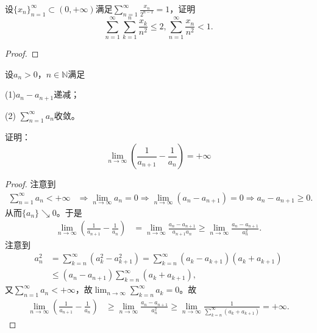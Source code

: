 \documentclass[../../main.tex]{subfiles}%
\begin{document}
\begin{example}
设$\{x_n\}_{n = 1}^{\infty} \subset (0,+\infty)$满足$\sum_{n = 1}^{\infty} \frac{x_n}{2^{n - 1}} = 1$，证明
\[
\sum_{n = 1}^{\infty} \sum_{k = 1}^n \frac{x_k}{n^2} \leqslant 2, \sum_{n = 1}^{\infty} \frac{x_n}{n^2} < 1.
\]
\end{example}
\begin{proof}



\end{proof}

\begin{example}
设$a_n > 0$，$n \in \mathbb{N}$满足

(1)$a_n - a_{n + 1}$递减；

(2) $\sum_{n = 1}^{\infty} a_n$收敛。

证明：
\[
\lim_{n \to \infty} \left( \frac{1}{a_{n + 1}} - \frac{1}{a_n} \right) = +\infty
\]
\end{example}
\begin{proof}

注意到
\begin{align*}
\sum_{n=1}^{\infty}{a_n}<+\infty &\Longrightarrow \lim_{n\rightarrow \infty}a_n=0\Longrightarrow \lim_{n\rightarrow \infty}\left( a_n-a_{n+1} \right) =0\Longrightarrow a_n-a_{n+1}\geqslant 0.
\end{align*}
从而$\{ a_n \} \searrow 0$。于是
\begin{align*}
\lim_{n\rightarrow \infty}\left( \frac{1}{a_{n+1}}-\frac{1}{a_n} \right) &=\lim_{n\rightarrow \infty}\frac{a_n-a_{n+1}}{a_{n+1}a_n}\geqslant \lim_{n\rightarrow \infty}\frac{a_n-a_{n+1}}{a_{n}^{2}}.
\end{align*}
注意到
\begin{align*}
a_{n}^{2}&=\sum_{k=n}^{\infty}{\left( a_{k}^{2}-a_{k+1}^{2} \right)}=\sum_{k=n}^{\infty}{\left( a_k-a_{k+1} \right) \left( a_k+a_{k+1} \right)} \\
&\leqslant \left( a_n-a_{n+1} \right) \sum_{k=n}^{\infty}{\left( a_k+a_{k+1} \right)},
\end{align*}
又$\sum_{n=1}^{\infty}{a_n}<+\infty$，故$\lim_{n\rightarrow \infty}\sum_{k=n}^{\infty}{a_k}=0$。故
\begin{align*}
\lim_{n\rightarrow \infty}\left( \frac{1}{a_{n+1}}-\frac{1}{a_n} \right) &\geqslant \lim_{n\rightarrow \infty}\frac{a_n-a_{n+1}}{a_{n}^{2}}\geqslant \lim_{n\rightarrow \infty}\frac{1}{\sum\limits_{k=n}^{\infty}{\left( a_k+a_{k+1} \right)}}=+\infty .
\end{align*}

\end{proof}
\end{document}
